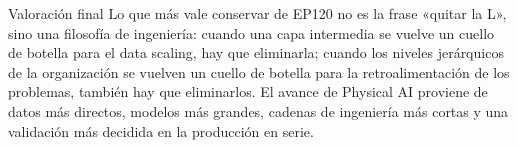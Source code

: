 \begin{importantbox}{Valoración final}
Lo que más vale conservar de EP120 no es la frase «quitar la L», sino una filosofía de ingeniería: cuando una capa intermedia se vuelve un cuello de botella para el data scaling, hay que eliminarla; cuando los niveles jerárquicos de la organización se vuelven un cuello de botella para la retroalimentación de los problemas, también hay que eliminarlos. El avance de Physical AI proviene de datos más directos, modelos más grandes, cadenas de ingeniería más cortas y una validación más decidida en la producción en serie.
\end{importantbox}


